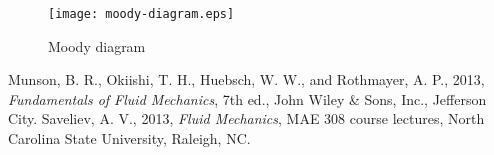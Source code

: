 \documentclass{article}
\begin{document}
\begin{figure}
  \centering
  \texttt{[image: moody-diagram.eps]}
  \caption{Moody diagram}\label{fig:moody}
\end{figure}

\begin{thebibliography}{99}
 Munson, B. R., Okiishi, T. H., Huebsch, W. W., and Rothmayer, A. P., 2013,
  \emph{Fundamentals of Fluid Mechanics}, 7th ed., John Wiley \& Sons, Inc., Jefferson City.
 Saveliev, A. V., 2013, \emph{Fluid Mechanics}, MAE 308 course lectures, North
  Carolina State University, Raleigh, NC.
\end{thebibliography}
\end{document}

